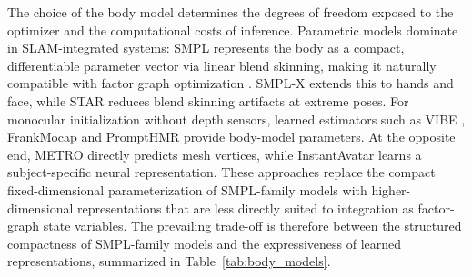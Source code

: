 The choice of the body model determines the degrees of freedom exposed to the optimizer and the computational costs of inference. 
Parametric models dominate in SLAM-integrated systems: SMPL \cite{loper_smpl_2015} represents the body as a compact, differentiable parameter vector via linear blend skinning, making it naturally compatible with factor graph optimization \cite{henning_bodyslam_2022}\cite{henning_bodyslam_2023}.
SMPL-X \cite{SMPL-X:2019} extends this to hands and face, while STAR \cite{STAR:2020} reduces blend skinning artifacts at extreme poses. 
For monocular initialization without depth sensors,  learned estimators such as VIBE \cite{kocabas2019vibe}, FrankMocap \cite{rong2021frankmocap}\cite{joo2020eft} and PromptHMR \cite{wang2025prompthmr} provide  body-model parameters. 
At the opposite end,  METRO \cite{lin2021end-to-end} directly predicts mesh vertices, while  InstantAvatar \cite{jiang2022instantavatar}  learns a subject-specific neural representation. These approaches replace the compact fixed-dimensional parameterization of SMPL-family models with higher-dimensional representations that are less directly suited to integration as factor-graph state variables. 
The prevailing trade-off is therefore between the structured compactness of SMPL-family models and the expressiveness of learned representations, summarized in Table~\ref{tab:body_models}.

